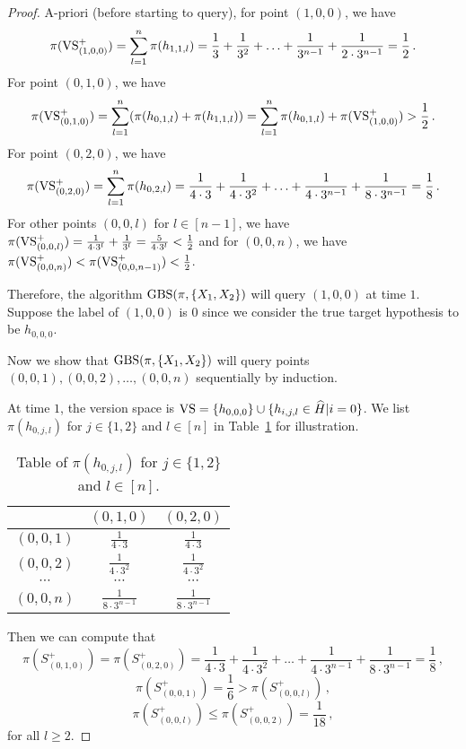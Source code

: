 \begin{proof}
    A-priori (before starting to query), for point $(1,0,0)$, we have 
    \begin{equation*}
        \pi(\mathrm{VS}_{(1,0,0)}^+) = \sum_{l=1}^n \pi(h_{1,1,l}) = \frac{1}{3} +\frac{1}{3^2} +\ldots +\frac{1}{3^{n-1}} +\frac{1}{2\cdot 3^{n-1}} =\frac{1}{2}\,.
    \end{equation*}   
    For point $(0,1,0)$, we have
    \[\pi(\mathrm{VS}_{(0,1,0)}^+) = \sum_{l=1}^n (\pi(h_{0,1,l}) + \pi(h_{1,1,l}))= \sum_{l=1}^n \pi(h_{0,1,l}) + \pi(\mathrm{VS}_{(1,0,0)}^+) >\frac{1}{2}\,.\]
    For point $(0,2,0)$, we have
    \[\pi(\mathrm{VS}_{(0,2,0)}^+) = \sum_{l=1}^n \pi(h_{0,2,l}) = \frac{1}{4\cdot 3} +\frac{1}{4\cdot 3^2} +\ldots +\frac{1}{4\cdot 3^{n-1}} +\frac{1}{8\cdot 3^{n-1}} =\frac{1}{8}\,.\]
    For other points $(0,0,l)$ for $l\in [n-1]$, we have $\pi(\mathrm{VS}_{(0,0,l)}^+) = \frac{1}{4\cdot 3^l} + \frac{1}{3^l} = \frac{5}{4\cdot 3^l}<\frac{1}{2}$ and for $(0,0,n)$, we have $\pi(\mathrm{VS}_{(0,0,n)}^+)<\pi(\mathrm{VS}_{(0,0,n-1)}^+)<\frac{1}{2}$.
    
    Therefore, the algorithm $\textrm{GBS}(\pi,\{X_1,X_2\})$ will query $(1,0,0)$ at time $1$.
    Suppose the label of $(1,0,0)$ is $0$ since we consider the true target hypothesis to be $h_{0,0,0}$.
    
    Now we show that $\textrm{GBS}(\pi,\{X_1,X_2\})$ will query points $(0,0,1), (0,0,2),\ldots, (0,0,n)$ sequentially by induction.
    
    At time $1$, the version space is $\mathrm{VS} = \{h_{0,0,0}\}\cup \{h_{i,j,l}\in \widehat H|i=0\}$. We list $\pi(h_{0,j,l})$ for $j\in \{1,2\}$ and $l\in [n]$ in Table~\ref{tab:pi-0jl} for illustration.
    \begin{table}[H]
        \centering
        \begin{tabular}{c|c|c}
             & $(0,1,0)$ & $(0,2,0)$\\\hline
            $(0,0,1)$ & $\frac{1}{4 \cdot 3}$ & $\frac{1}{4 \cdot 3}$\\\hline
            $(0,0,2)$ &$\frac{1}{4 \cdot 3^2}$ & $\frac{1}{4 \cdot 3^2}$ \\\hline
            $\cdots$ & $\cdots$ & $\cdots$ \\\hline
            $(0,0,n)$ & $\frac{1}{8 \cdot 3^{n-1}}$ & $\frac{1}{8 \cdot 3^{n-1}}$\\\hline
        \end{tabular}
        \caption{Table of $\pi(h_{0,j,l})$ for $j\in \{1,2\}$ and $l\in [n]$.}
        \label{tab:pi-0jl}
    \end{table}
    Then we can compute that 
    \[\pi(S_{(0,1,0)}^+) = \pi(S_{(0,2,0)}^+)=\frac{1}{4\cdot 3} +\frac{1}{4\cdot 3^2} +\ldots +\frac{1}{4\cdot 3^{n-1}} +\frac{1}{8\cdot 3^{n-1}} =\frac{1}{8}\,,\]
    \[\pi(S_{(0,0,1)}^+) = \frac{1}{6}> \pi(S_{(0,0,l)}^+)\,,\]
    \[\pi(S_{(0,0,l)}^+) \leq \pi(S_{(0,0,2)}^+) = \frac{1}{18}\,,\]
    for all $l\geq 2$. 
    

\end{proof}
